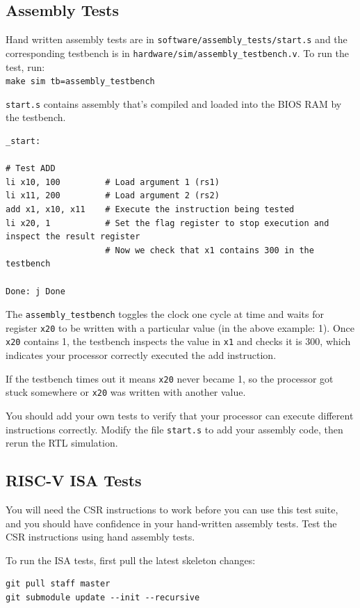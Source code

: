 \documentclass[11pt]{article}
\begin{document}
\subsection{Assembly Tests}
\label{assembly_tests}
Hand written assembly tests are in \verb|software/assembly_tests/start.s| and the corresponding testbench is in \verb|hardware/sim/assembly_testbench.v|.
To run the test, run:\\
\verb|make sim tb=assembly_testbench|

\verb|start.s| contains assembly that's compiled and loaded into the BIOS RAM by the testbench.
\begin{verbatim}
_start:

# Test ADD
li x10, 100         # Load argument 1 (rs1)
li x11, 200         # Load argument 2 (rs2)
add x1, x10, x11    # Execute the instruction being tested
li x20, 1           # Set the flag register to stop execution and inspect the result register
                    # Now we check that x1 contains 300 in the testbench

Done: j Done
\end{verbatim}

The \verb|assembly_testbench| toggles the clock one cycle at time and waits for register \verb|x20| to be written with a particular value (in the above example: 1).
Once \verb|x20| contains 1, the testbench inspects the value in \verb|x1| and checks it is 300, which indicates your processor correctly executed the add instruction.

If the testbench times out it means \verb|x20| never became 1, so the processor got stuck somewhere or \verb|x20| was written with another value.

You should add your own tests to verify that your processor can execute different instructions correctly. Modify the file \verb|start.s| to add your assembly code, then rerun the RTL simulation.

\subsection{RISC-V ISA Tests}\label{riscv-isa-tests}
You will need the CSR instructions to work before you can use this test suite, and you should have confidence in your hand-written assembly tests.
Test the CSR instructions using hand assembly tests.

To run the ISA tests, first pull the latest skeleton changes:
\begin{verbatim}
git pull staff master
git submodule update --init --recursive
\end{verbatim}
\end{document}
